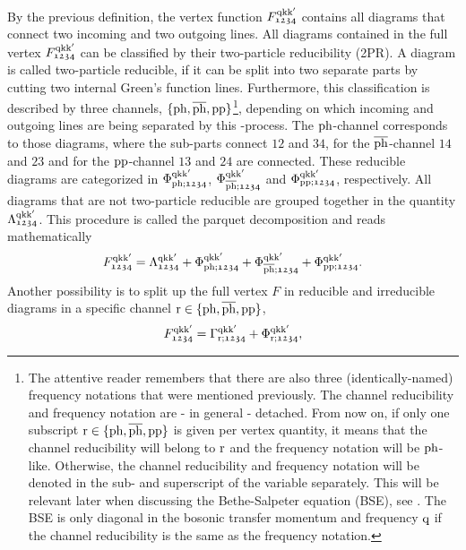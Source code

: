 \documentclass[../../main.tex]{subfiles}
\begin{document}
By the previous definition, the vertex function $F_{\mathfrak{1234}}^{\text{q}\text{k}\text{k}'}$ contains all diagrams that connect two incoming and two outgoing lines. All diagrams contained in the full vertex $F_{\mathfrak{1234}}^{\text{q}\text{k}\text{k}'}$ can be classified by their two-particle reducibility (2PR). A diagram is called two-particle reducible, if it can be split into two separate parts by cutting two internal Green's function lines. Furthermore, this classification is described by three channels, $\{\text{ph},\overline{\text{ph}},\text{pp}\}$\footnote{The attentive reader remembers that there are also three (identically-named) frequency notations that were mentioned previously. The channel reducibility and frequency notation are - in general - detached. From now on, if only one subscript $\text{r}\in\{\text{ph},\overline{\text{ph}},\text{pp}\}$ is given per vertex quantity, it means that the channel reducibility will belong to $\text{r}$ and the frequency notation will be $\text{ph}$-like. Otherwise, the channel reducibility and frequency notation will be denoted in the sub- and superscript of the variable separately. This will be relevant later when discussing the Bethe-Salpeter equation (BSE), see . The BSE is only diagonal in the bosonic transfer momentum and frequency $\text{q}$ if the channel reducibility is the same as the frequency notation.}, depending on which incoming and outgoing lines are being separated by this -process. The $\text{ph}$-channel corresponds to those diagrams, where the sub-parts connect $\mathfrak{12}$ and $\mathfrak{34}$, for the $\overline{\text{ph}}$-channel $\mathfrak{14}$ and $\mathfrak{23}$ and for the $\text{pp}$-channel $\mathfrak{13}$ and $\mathfrak{24}$ are connected. These reducible diagrams are categorized in $\Phi_{\text{ph};\mathfrak{1234}}^{\text{q}\text{k}\text{k}'}$, $\Phi_{\overline{\text{ph}};\mathfrak{1234}}^{\text{q}\text{k}\text{k}'}$ and $\Phi_{\text{pp};\mathfrak{1234}}^{\text{q}\text{k}\text{k}'}$, respectively. All diagrams that are not two-particle reducible are grouped together in the quantity $\Lambda_{\mathfrak{1234}}^{\text{q}\text{k}\text{k}'}$. This procedure is called the parquet decomposition and reads mathematically
\begin{align}\label{eq:parquet_decomposition}
	F_{\mathfrak{1234}}^{\text{q}\text{k}\text{k}'}=\Lambda_{\mathfrak{1234}}^{\text{q}\text{k}\text{k}'}+\Phi_{\text{ph};\mathfrak{1234}}^{\text{q}\text{k}\text{k}'}+\Phi_{\overline{\text{ph}};\mathfrak{1234}}^{\text{q}\text{k}\text{k}'}+\Phi_{\text{pp};\mathfrak{1234}}^{\text{q}\text{k}\text{k}'}.
\end{align}
Another possibility is to split up the full vertex $F$ in reducible and irreducible diagrams in a specific channel $\text{r}\in\{\text{ph},\overline{\text{ph}},\text{pp}\}$,
\begin{align}\label{eq:full_vertex_gamma_phi}
	F_{\mathfrak{1234}}^{\text{q}\text{k}\text{k}'}=\Gamma_{\text{r};\mathfrak{1234}}^{\text{q}\text{k}\text{k}'}+\Phi_{\text{r};\mathfrak{1234}}^{\text{q}\text{k}\text{k}'},
\end{align}
\end{document}
